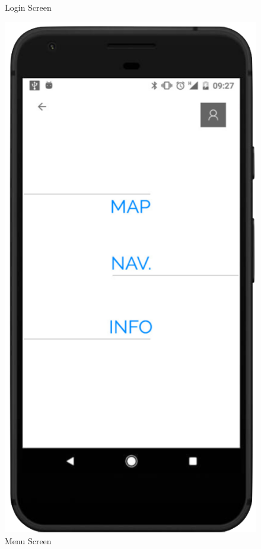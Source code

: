 \documentclass[compress]{beamer}
\begin{document}
\begin{frame}
\begin{figure}[!htb]
              \caption{\scriptsize Login Screen}
            \endminipage\hfill
              \includegraphics[width=\linewidth]{2.png}
              \caption{\scriptsize Menu Screen}
            \endminipage\hfill

\end{figure}
\end{frame}
\end{document}
